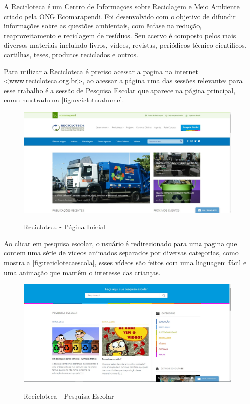 \documentclass[
	12pt,				%
	openright,			%
	twoside,			%
	a4paper,			%
	english,			%
	french,				%
	spanish,			%
	brazil				%
	]{abntex2}
\begin{document}
A Recicloteca é um Centro de Informações sobre Reciclagem e Meio Ambiente criado pela ONG Ecomarapendi. Foi desenvolvido com o objetivo de difundir informações sobre as questões ambientais, com ênfase na redução, reaproveitamento e reciclagem de resíduos. Seu acervo é composto pelos mais diversos materiais incluindo livros, vídeos, revistas, periódicos técnico-científicos, cartilhas, teses, produtos reciclados e outros.

Para utilizar a Recicloteca é preciso acessar a pagina na internet \href{http://www.recicloteca.org.br/}{<www.recicloteca.org.br>}, ao acessar a página uma das sessões relevantes para esse trabalho é a sessão de \href{http://www.recicloteca.org.br/pesquisa/}{Pesquisa Escolar} que aparece na página principal, como mostrado na \autoref{fig:reciclotecahome}.

\begin{figure}[h]
\centering
   \caption{Recicloteca - Página Inicial}
   \includegraphics[scale=0.40]{media/reciclotecahome.jpg}
     \label{fig:reciclotecahome}
\end{figure}

\newpage
Ao clicar em pesquisa escolar, o usuário é redirecionado para uma pagina que contem uma série de vídeos animados separados por diversas categorias, como mostra a \autoref{fig:reciclotecaescola}, esses vídeos são feitos com uma linguagem fácil e uma animação que mantêm o interesse das crianças.


\begin{figure}[h]
\centering
   \caption{Recicloteca - Pesquisa Escolar}
   \includegraphics[scale=0.40]{media/reciclotecaescola.jpg}
     \label{fig:reciclotecaescola}
\end{figure}
\end{document}
